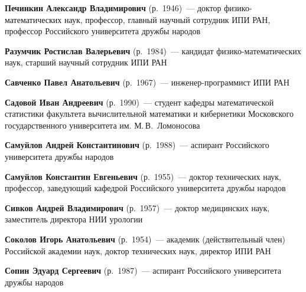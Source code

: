 \begin{multicols}{2}
\vspace*{3pt}

 \noindent 
\textbf{Печинкин Александр Владимирович} (р.\ 1946)~--- доктор 
фи\-зи\-ко-ма\-те\-ма\-ти\-че\-ских наук, профессор, \mbox{главный} научный 
сотрудник ИПИ РАН, профессор Рос\-сий\-ско\-го университета дружбы народов

\vspace*{3pt}

\noindent 
\textbf{Разумчик Ростислав Валерьевич} (р.\ 1984)~--- кандидат фи\-зи\-ко-ма\-те\-ма\-ти\-че\-ских 
наук, старший научный сотрудник ИПИ РАН

\vspace*{3pt}

\noindent 
\textbf{Савченко Павел  Анатольевич} (р.\ 1967)~--- ин\-же\-нер-про\-грам\-мист ИПИ РАН 

\vspace*{3pt}

\noindent \textbf{Садовой Иван Андреевич} (р.\ 1990)~--- студент ка\-федры 
математической статистики факультета вы\-чис\-ли\-тель\-ной математики и 
кибернетики Московского государственного университета им.\linebreak 
М.\,В.~Ломоносова

\vspace*{3pt}


\noindent 
\textbf{Самуйлов Андрей Константинович} (р.\ 1988)~--- аспирант Российского университета 
дружбы народов

\vspace*{3pt}

\noindent 
\textbf{Самуйлов Константин Евгеньевич} (р.\ 1955)~--- доктор технических наук, 
профессор, заведующий ка\-фед\-рой Российского университета дружбы народов

\pagebreak

\noindent 
\textbf{Сивков Андрей Владимирович} (р.\ 1957)~--- доктор медицинских наук, заместитель директора НИИ 
урологии 

\vspace*{3pt}

\noindent 
\textbf{Соколов  Игорь Анатольевич} (р.\ 1954)~--- академик (действительный член) Российской 
академии наук, доктор технических наук, директор ИПИ РАН 

\vspace*{3pt}

\noindent 
\textbf{Сопин Эдуард Сергеевич} (р.\ 1987)~--- аспирант Российского университета дружбы 
народов


\end{multicols}
